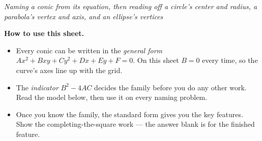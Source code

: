 \documentclass[12pt]{article}
\begin{document}

\begin{center}\small\textit{Naming a conic from its equation, then reading off a circle's
center and radius, a parabola's vertex and axis, and an ellipse's vertices}\end{center}

\noindent\small\textbf{How to use this sheet.}
\begin{itemize}[label={$\bullet$}, leftmargin=1.1cm, itemsep=1pt, topsep=2pt]
  \item Every conic can be written in the \emph{general form}
        $Ax^2 + Bxy + Cy^2 + Dx + Ey + F = 0$. On this sheet $B = 0$ every time, so the
        curve's axes line up with the grid.
  \item The \emph{indicator} $B^2 - 4AC$ decides the family before you do any other work.
        Read the model below, then use it on every naming problem.
  \item Once you know the family, the standard form gives you the key features. Show the
        completing-the-square work --- the answer blank is for the finished feature.
\end{itemize}
\normalsize

\medskip
\end{document}
